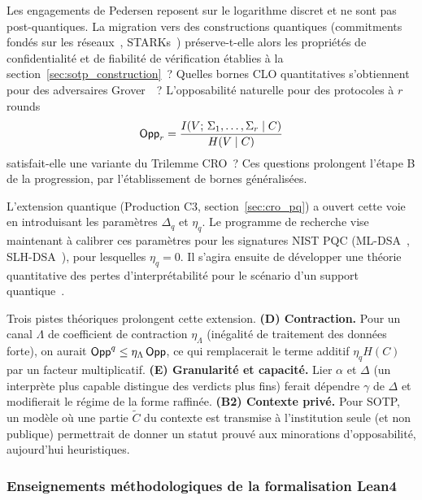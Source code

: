 \begin{sloppypar}
Les engagements de Pedersen reposent sur le logarithme discret et ne sont pas post-quantiques.
La migration vers des constructions quantiques (commitments fond\'es sur les
r\'eseaux~\cite{Ajtai96,Regev05,Peikert2016},
STARKs~\cite{STARKs18,BenSasson2018}) pr\'eserve-t-elle alors les propri\'et\'es
de confidentialit\'e et de fiabilit\'e de v\'erification \'etablies \`a la
section~\ref{sec:sotp_construction}~? Quelles bornes CLO quantitatives
s'obtiennent pour des adversaires Grover~\cite{Grover96,Zhandry2012}~?
L'opposabilit\'e naturelle pour des protocoles \`a $r$ rounds
\begin{equation}
  \mathsf{Opp}_r = \frac{I(V;\,\Sigma_1,\ldots,\Sigma_r \mid C)}{H(V \mid C)}
\end{equation}
satisfait-elle une variante du Trilemme CRO~? Ces questions prolongent l'\'etape B
de la progression, par l'\'etablissement de bornes g\'en\'eralis\'ees.

L'extension quantique (Production C3, section~\ref{sec:cro_pq}) a ouvert
cette voie en introduisant les param\`etres $\Delta_q$ et $\eta_q$. Le
programme de recherche vise maintenant \`a calibrer ces param\`etres pour les
signatures NIST PQC (ML-DSA~\cite{Dilithium2022}, SLH-DSA~\cite{SPHINCS2022}),
pour lesquelles $\eta_q = 0$. Il s'agira ensuite de d\'evelopper une th\'eorie quantitative des
pertes d'interpr\'etabilit\'e pour le sc\'enario d'un support quantique~\cite{NielsenChuang2010,Preskill1998}.

Trois pistes th\'eoriques prolongent cette extension. \textbf{(D) Contraction.}
Pour un canal $\Lambda$ de coefficient de contraction $\eta_\Lambda$
(in\'egalit\'e de traitement des donn\'ees forte), on aurait
$\mathsf{Opp}^q \leq \eta_\Lambda\,\mathsf{Opp}$, ce qui remplacerait le terme additif
$\eta_q H(C)$ par un facteur multiplicatif. \textbf{(E) Granularit\'e et
capacit\'e.} Lier $\alpha$ et $\Delta$ (un interpr\`ete plus capable distingue
des verdicts plus fins) ferait d\'ependre $\gamma$ de $\Delta$ et modifierait le
r\'egime de la forme raffin\'ee. \textbf{(B2) Contexte priv\'e.} Pour SOTP, un
mod\`ele o\`u une partie $\tilde C$ du contexte est transmise \`a l'institution
seule (et non publique) permettrait de donner un statut prouv\'e aux
minorations d'opposabilit\'e, aujourd'hui heuristiques.

\subsubsection{Enseignements m\'ethodologiques de la formalisation Lean4}
\label{subsubsec:enseignements_lean4}


\end{sloppypar}

